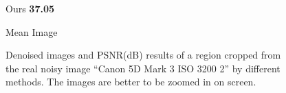 \begin{figure}
{\begin{minipage}[t]{0.19\textwidth}
{\footnotesize Ours \textbf{37.05}}
\end{minipage}
\begin{minipage}[t]{0.19\textwidth}
\centering
{}
{\footnotesize Mean Image}
\end{minipage}
}
    \caption{Denoised images and PSNR(dB) results of a region cropped from the real noisy image ``Canon 5D Mark 3 ISO 3200 2'' \cite{crosschannel2016} by different methods. The images are better to be zoomed in on screen.}
    \label{fig3-13}
\end{figure}

